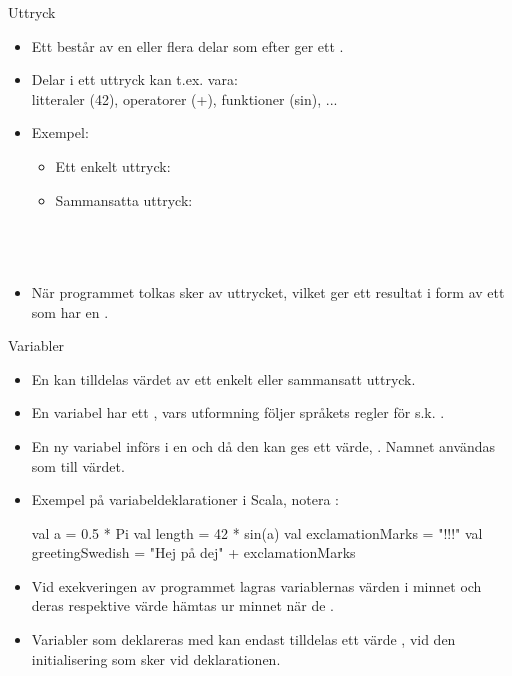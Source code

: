 \documentclass{simpleslides}
\begin{document}
  
  \begin{Slide}{Uttryck}
  \begin{itemize}
  \item Ett  består av en eller flera delar som efter  ger ett .
  \item Delar i ett uttryck kan t.ex. vara: \\ litteraler (42), operatorer (+), funktioner (sin), ...
  \item Exempel:
  \begin{itemize}
  \item Ett enkelt uttryck: \\ 
  \item Sammansatta uttryck: \\
   \\
   \\
   \\
  \end{itemize}
  
  \item När programmet tolkas sker  av uttrycket, vilket ger ett resultat i form av ett  som har en .
  \end{itemize}
  \end{Slide}
  
  
  \begin{Slide}{Variabler}\SlideFontSmall
  \begin{itemize}
  \item En  kan tilldelas värdet av ett enkelt eller sammansatt uttryck.
  \item En variabel har ett , vars utformning följer språkets regler för s.k. .
  \item En ny variabel införs i en  och då den kan ges ett värde, . Namnet användas som  till värdet.
  \item Exempel på variabeldeklarationer i Scala, notera  :
  \begin{Code}
  val a = 0.5 * Pi
  val length = 42 * sin(a)
  val exclamationMarks = "!!!"
  val greetingSwedish = "Hej på dej" + exclamationMarks
  \end{Code}
  
  \item Vid exekveringen av programmet lagras variablernas värden i minnet och deras respektive värde hämtas ur minnet när de .
  
  \item Variabler som deklareras med  kan endast tilldelas ett värde , vid den initialisering som sker vid deklarationen.
  \end{itemize}
  
  \end{Slide}
  
\end{document}

